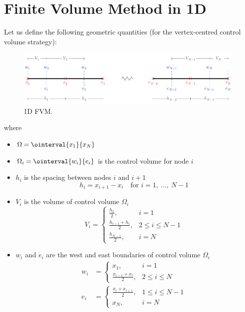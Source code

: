 \documentclass{article}
\begin{document}
\section{Finite Volume Method in 1D}
Let us define the following geometric quantities (for the
vertex-centred control volume strategy):
\begin{figure}[H]
    \centering
    \includegraphics[width = \linewidth]{figures/1d-fvm.pdf}
    \caption{1D FVM.} %
\end{figure}
where
\begin{itemize}
    \item \(\Omega = \ointerval{x_1}{x_N}\)
    \item \(\Omega_i = \ointerval{w_i}{e_i}\) is the control volume for node \(i\)
    \item \(h_i\) is the spacing between nodes \(i\) and \(i + 1\)
          \begin{equation*}
              h_i = x_{i+1} - x_i \quad \text{for \(i = 1,\: \ldots,\: N-1\)}
          \end{equation*}
    \item \(V_i\) is the volume of control volume \(\Omega_i\)
          \begin{equation*}
              V_i =
              \begin{cases}
                  \displaystyle \frac{h_1}{2},           & i = 1                       \\
                  \displaystyle \frac{h_{i-1} + h_i}{2}, & 2 \leqslant i \leqslant N-1 \\
                  \displaystyle \frac{h_{N-1}}{2},       & i = N
              \end{cases}
          \end{equation*}
    \item \(w_i\) and \(e_i\) are the west and east boundaries of
          control volume \(\Omega_i\)
          \begin{align*}
              w_i & =
              \begin{cases}
                  \displaystyle x_1,                     & i = 1                     \\
                  \displaystyle \frac{x_{i-1} + x_i}{2}, & 2 \leqslant i \leqslant N
              \end{cases}
              \\
              e_i & =
              \begin{cases}
                  \displaystyle \frac{x_i + x_{i+1}}{2}, & 1 \leqslant i \leqslant N-1 \\
                  \displaystyle x_N,                     & i = N
              \end{cases}
          \end{align*}
\end{itemize}
\end{document}
